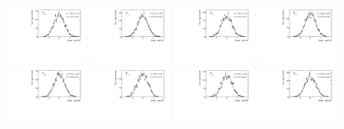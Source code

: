 \begin{figure}
\includegraphics[width=0.24\textwidth]{figs/kpimm/angular-analysis/toys/pull_m_10.pdf}
\includegraphics[width=0.24\textwidth]{figs/kpimm/angular-analysis/toys/pull_m_11.pdf}
\includegraphics[width=0.24\textwidth]{figs/kpimm/angular-analysis/toys/pull_m_12.pdf}
\includegraphics[width=0.24\textwidth]{figs/kpimm/angular-analysis/toys/pull_m_13.pdf}
\includegraphics[width=0.24\textwidth]{figs/kpimm/angular-analysis/toys/pull_m_14.pdf}
\includegraphics[width=0.24\textwidth]{figs/kpimm/angular-analysis/toys/pull_m_15.pdf}
\includegraphics[width=0.24\textwidth]{figs/kpimm/angular-analysis/toys/pull_m_16.pdf}
\includegraphics[width=0.24\textwidth]{figs/kpimm/angular-analysis/toys/pull_m_17.pdf}

\end{figure}
